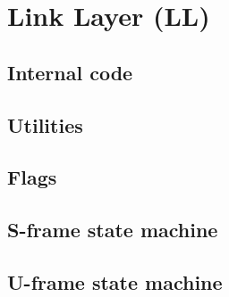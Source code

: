 \documentclass[a4paper, 11pt]{report}
\begin{document}

\fancyhfoffset[E,O]{0pt}

\section{Link Layer (LL)}



\subsection{Internal code}



\subsection{Utilities}



\begin{landscape}
\subsection{Flags}

\end{landscape}

\subsection{S-frame state machine}



\subsection{U-frame state machine}


\end{document}
